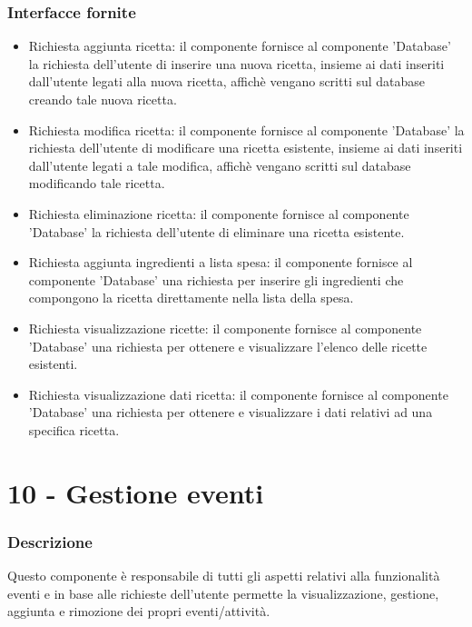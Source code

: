 \documentclass[a4paper,12pt]{article}
\begin{document}
\subsubsection*{Interfacce fornite}
\begin{itemize} \setlength\itemsep{0.01em}
\item {\sffamily Richiesta aggiunta ricetta}: il componente fornisce al componente 'Database' la richiesta dell'utente di inserire una nuova ricetta, insieme ai dati inseriti dall'utente legati alla nuova ricetta, affichè vengano scritti sul database creando tale nuova ricetta.
\item {\sffamily Richiesta modifica ricetta}: il componente fornisce al componente 'Database'  la richiesta dell'utente di modificare una ricetta esistente, insieme ai dati inseriti dall'utente legati a tale modifica, affichè vengano scritti sul database modificando tale ricetta.
\item {\sffamily Richiesta eliminazione ricetta}: il componente fornisce al componente 'Database'  la richiesta dell'utente di eliminare una ricetta esistente.
\item {\sffamily Richiesta aggiunta ingredienti a lista spesa}: il componente fornisce al componente 'Database' una richiesta per inserire gli ingredienti che compongono la ricetta direttamente nella lista della spesa.
\item {\sffamily Richiesta visualizzazione ricette}: il componente fornisce al componente 'Database' una richiesta per ottenere e visualizzare l'elenco delle ricette esistenti.
\item {\sffamily Richiesta visualizzazione dati ricetta}: il componente fornisce al componente 'Database' una richiesta per ottenere e visualizzare i dati relativi ad una specifica ricetta.
\end{itemize}



\section*{10 -  Gestione eventi}
\subsubsection*{Descrizione}
Questo componente è responsabile di tutti gli aspetti relativi alla funzionalità eventi e in base alle richieste dell'utente permette la visualizzazione, gestione, aggiunta e rimozione dei propri eventi/attività.
\end{document}
